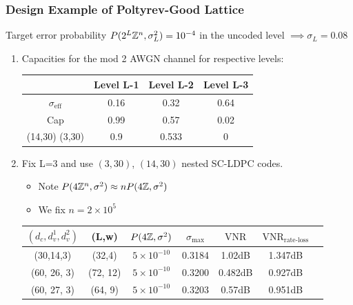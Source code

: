 \documentclass[10pt,presentation]{beamer}
\begin{document}
\begin{frame}\frametitle{Design Example of Poltyrev-Good Lattice}
Target error probability $P(2^L\mathbb{Z}^n,\sigma_{L}^2)=10^{-4}$ in the uncoded level $\implies\sigma_{L}=0.08$
\begin{enumerate}
\item  Capacities for the mod 2 AWGN  channel for respective levels: 
\vspace{0.1in}
\begin{center}
\begin{tabular}{| c | c | c | c | }
\hline
 & Level L-1   &  Level L-2  & Level L-3 \\
\hline 
$\sigma_{\text{eff}}$ & 0.16   &  0.32  & 0.64 \\ \hline
 Cap                           &  0.99 & 0.57 & 0.02 \\   \hline
 (14,30) (3,30)         &  0.9 & 0.533 & 0 \\   \hline
\end{tabular}
\end{center}
\vspace{0.1in}
\item Fix L=3 and use $(3,30)$, $(14,30)$ nested SC-LDPC codes.
\begin{itemize}
\item Note $P(4\mathbb{Z}^n,\sigma^2)\approx nP(4\mathbb{Z},\sigma^2)$
\item We fix $n=2\times 10^5$
\end{itemize}
\vspace{0.07in}
\begin{center}
\begin{tabular}{c c c c c c c}
\hline  \hline
$(d_{c},d_{v}^{1},d_{v}^{2})$ &(L,w)& $P(4\mathbb{Z},\sigma^{2})$ & $\sigma_{\text{max}}$ &$\text{VNR}$ &$\text{VNR}_{\text{rate-loss}}$\\
\hline
(30,14,3) & (32,4) & $5 \times 10^{-10}$ & 0.3184 & 1.02dB & 1.347dB \\
(60, 26, 3)& (72, 12)& $5 \times 10^{-10}$ & 0.3200 &0.482dB & 0.927dB\\
(60, 27, 3)& (64, 9)& $5 \times 10^{-10}$  &  0.3203 & 0.57dB & 0.951dB\\
\end{tabular}
\end{center}
\end{enumerate}
\end{frame}
\end{document}

